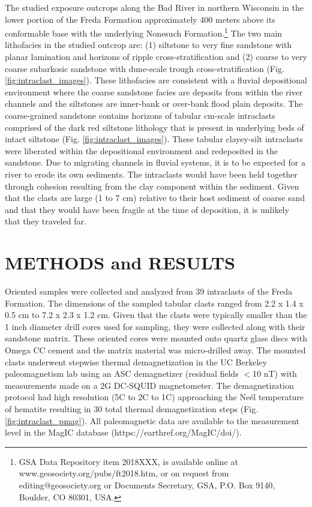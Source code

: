 \documentclass[11pt,letterpaper]{article}
\begin{document}
The studied exposure outcrops along the Bad River in northern Wisconsin in the lower portion of the Freda Formation approximately 400 meters above its conformable base with the underlying Nonesuch Formation.\footnote{GSA Data Repository item 2018XXX, is available online at www.geosociety.org/pubs/ft2018.htm, or on request from editing@geosociety.org or Documents Secretary, GSA, P.O. Box 9140, Boulder, CO 80301, USA.} The two main lithofacies in the studied outcrop are: (1) siltstone to very fine sandstone with planar lamination and horizons of ripple cross-stratification and (2) coarse to very coarse subarkosic sandstone with dune-scale trough cross-stratification (Fig. \ref{fig:intraclast_images}).  These lithofacies are consistent with a fluvial depositional environment where the coarse sandstone facies are deposits from within the river channels and the siltstones are inner-bank or over-bank flood plain deposits. The coarse-grained sandstone contains horizons of tabular cm-scale intraclasts comprised of the dark red siltstone lithology that is present in underlying beds of intact siltstone (Fig. \ref{fig:intraclast_images}). These tabular clayey-silt intraclasts were liberated within the depositional environment and redeposited in the sandstone. Due to migrating channels in fluvial systems, it is to be expected for a river to erode its own sediments. The intraclasts would have been held together through cohesion resulting from the clay component within the sediment. Given that the clasts are large (1 to 7 cm) relative to their host sediment of coarse sand and that they would have been fragile at the time of deposition, it is unlikely that they traveled far. 

\section*{METHODS and RESULTS}

Oriented samples were collected and analyzed from 39 intraclasts of the Freda Formation. The dimensions of the sampled tabular clasts ranged from 2.2 x 1.4 x 0.5 cm to 7.2 x 2.3 x 1.2 cm. Given that the clasts were typically smaller than the 1 inch diameter drill cores used for sampling, they were collected along with their sandstone matrix. These oriented cores were mounted onto quartz glass discs with Omega CC cement and the matrix material was micro-drilled away. The mounted clasts underwent stepwise thermal demagnetization in the UC Berkeley paleomagnetism lab using an ASC demagnetizer (residual fields $<$10 nT) with measurements made on a 2G DC-SQUID magnetometer. The demagnetization protocol had high resolution (5\textdegree C to 2\textdegree C to 1\textdegree C) approaching the Ne\'el temperature of hematite resulting in 30 total thermal demagnetization steps (Fig. \ref{fig:intraclast_pmag}). All paleomagnetic data are available to the measurement level in the MagIC database (https://earthref.org/MagIC/doi/). 
\end{document}
